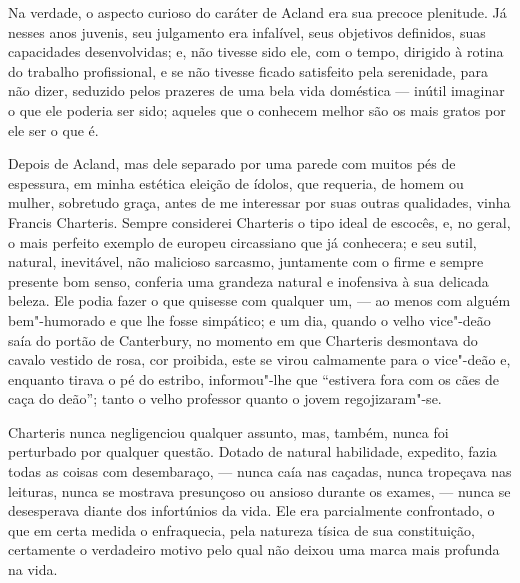 Na verdade, o aspecto curioso do caráter de Acland era sua precoce
plenitude. Já nesses anos juvenis, seu julgamento era infalível, seus
objetivos definidos, suas capacidades desenvolvidas; e, não tivesse sido
ele, com o tempo, dirigido à rotina do trabalho profissional, e se não
tivesse ficado satisfeito pela serenidade, para não dizer, seduzido
pelos prazeres de uma bela vida doméstica --- inútil imaginar o que ele
poderia ser sido; aqueles que o conhecem melhor são os mais gratos por
ele ser o que é.

Depois de Acland, mas dele separado por uma parede com muitos pés
de espessura, em minha estética eleição de ídolos, que requeria, de
homem ou mulher, sobretudo graça, antes de me interessar por suas outras
qualidades, vinha Francis Charteris. Sempre considerei Charteris o tipo
ideal de escocês, e, no geral, o mais perfeito exemplo de europeu
circassiano que já conhecera; e seu sutil, natural, inevitável, não
malicioso sarcasmo, juntamente com o firme e sempre presente bom senso,
conferia uma grandeza natural e inofensiva à sua delicada beleza. Ele
podia fazer o que quisesse com qualquer um, --- ao menos com alguém
bem"-humorado e que lhe fosse simpático; e um dia, quando o velho
vice"-deão saía do portão de Canterbury, no momento em que Charteris
desmontava do cavalo vestido de rosa, cor proibida, este se virou
calmamente para o vice"-deão e, enquanto tirava o pé do estribo,
informou"-lhe que ``estivera fora com os cães de caça do deão''; tanto o
velho professor quanto o jovem regojizaram"-se.

Charteris nunca negligenciou qualquer assunto, mas, também, nunca foi
perturbado por qualquer questão. Dotado de natural habilidade, expedito,
fazia todas as coisas com desembaraço, --- nunca caía nas caçadas, nunca
tropeçava nas leituras, nunca se mostrava presunçoso ou ansioso durante
os exames, --- nunca se desesperava diante dos infortúnios da vida. Ele
era parcialmente confrontado, o que em certa medida o enfraquecia, pela
natureza tísica de sua constituição, certamente o verdadeiro motivo pelo
qual não deixou uma marca mais profunda na vida.

